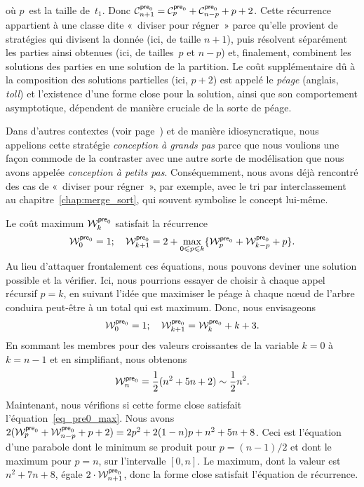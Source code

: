 où \(p\)~est la taille de~\(t_1\). Donc \(\C{\fun{pre}_0}{n+1} =
\C{\fun{pre}_0}{p} + \C{\fun{pre}_0}{n-p} + p + 2\). Cette récurrence
appartient à une classe dite «~diviser pour
régner~» parce qu'elle provient de
stratégies qui divisent la donnée (ici, de taille \(n+1\)), puis
résolvent séparément les parties ainsi obtenues (ici, de tailles~\(p\)
et \(n-p\)) et, finalement, combinent les solutions des parties en une
solution de la partition. Le coût supplémentaire dû à la composition
des solutions partielles (ici, \(p+2\)) est appelé le
\emph{péage} (anglais, \emph{toll}) et l'existence d'une
forme close pour la solution, ainsi que son comportement asymptotique,
dépendent de manière cruciale de la sorte de péage.

Dans d'autres contextes (voir page~\pageref{big-step}) et de manière
idiosyncratique, nous appelions cette stratégie \emph{conception à
  grands pas} parce que nous voulions une
façon commode de la contraster avec une autre sorte de modélisation
que nous avons appelée \emph{conception à petits
  pas}. Conséquemment, nous avons déjà
rencontré des cas de «~diviser pour régner~», par exemple, avec le tri
par interclassement au
chapitre~\vref{chap:merge_sort}, qui souvent symbolise le concept
lui-même.

Le coût maximum
\(\W{\fun{pre}_0}{k}\) satisfait la
récurrence
\begin{equation}
\W{\fun{pre}_0}{0} = 1;\quad
\W{\fun{pre}_0}{k+1} =
  2 + \max_{0 \leqslant p \leqslant k}\{\W{\fun{pre}_0}{p}
                                  + \W{\fun{pre}_0}{k-p} + p\}.
\index{pre0@$\W{\fun{pre}_0}{n}$}
\label{eq_pre0_max}
\end{equation}
Au lieu d'attaquer frontalement ces équations, nous pouvons deviner
une solution possible et la vérifier. Ici, nous pourrions essayer de
choisir à chaque appel récursif \(p=k\), en suivant l'idée que
maximiser le péage à chaque n{\oe}ud de l'arbre conduira peut-être à
un total qui est maximum. Donc, nous envisageons
\begin{equation}
\W{\fun{pre}_0}{0} = 1;\quad
\W{\fun{pre}_0}{k+1} = \W{\fun{pre}_0}{k} + k + 3.
\label{eq_max_pre0_rec}
\end{equation}
En sommant les membres pour des valeurs croissantes de la variable
\(k=0\) à \(k=n-1\) et en simplifiant, nous obtenons
\begin{equation*}
\W{\fun{pre}_0}{n} = \frac{1}{2}(n^2 + 5n + 2) \sim \frac{1}{2}n^2.
\end{equation*}
Maintenant, nous vérifions si cette forme close satisfait
l'équation~\eqref{eq_pre0_max}. Nous avons \(2(\W{\fun{pre}_0}{p} +
\W{\fun{pre}_0}{n-p} + p + 2) = 2p^2 + 2(1-n)p + n^2 + 5n + 8\). Ceci
est l'équation d'une parabole dont le minimum se produit pour \(p =
(n-1)/2\) et dont le maximum pour \(p = n\), sur l'intervalle
\([0,n]\). Le maximum, dont la valeur est \(n^2 + 7n + 8\), égale \(2
\cdot \W{\fun{pre}_0}{n+1}\), donc la forme close satisfait l'équation
de récurrence.

